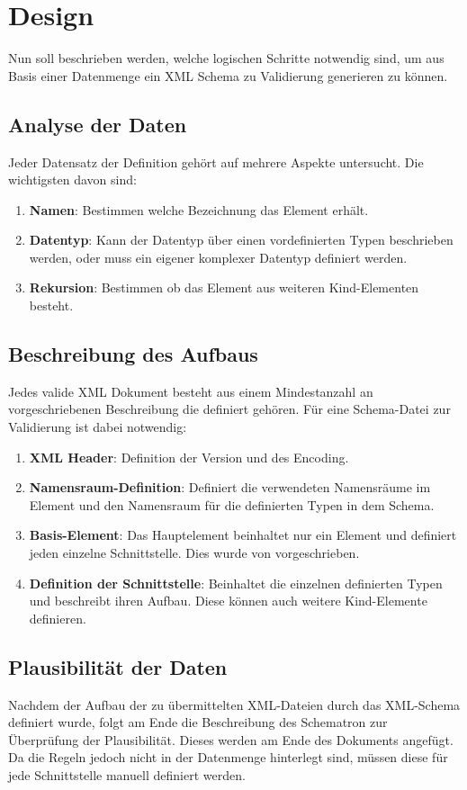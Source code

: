 \chapter{Design}
\label{cha:Design}
Nun soll beschrieben werden, welche logischen Schritte notwendig sind, um aus Basis einer Datenmenge ein XML Schema zu Validierung generieren zu können.

\section{Analyse der Daten}
Jeder Datensatz der Definition gehört auf mehrere Aspekte untersucht.
Die wichtigsten davon sind:

\begin{enumerate}
\item \textbf{Namen}: Bestimmen welche Bezeichnung das Element erhält.
\item \textbf{Datentyp}: Kann der Datentyp über einen vordefinierten Typen beschrieben werden, oder muss ein eigener komplexer Datentyp definiert werden. 
\item \textbf{Rekursion}: Bestimmen ob das Element aus weiteren Kind-Elementen besteht. 
\end{enumerate}

\section{Beschreibung des Aufbaus}
Jedes valide XML Dokument besteht aus einem Mindestanzahl an vorgeschriebenen Beschreibung die definiert gehören.
Für eine Schema-Datei zur Validierung ist dabei notwendig:

\begin{enumerate}
\item \textbf{XML Header}: Definition der Version und des Encoding.
\item \textbf{Namensraum-Definition}: Definiert die verwendeten Namensräume im Element und den Namensraum für die definierten Typen in dem Schema.
\item \textbf{Basis-Element}: Das Hauptelement beinhaltet nur ein Element und definiert jeden einzelne Schnittstelle. Dies wurde von \BMD vorgeschrieben.
\item \textbf{Definition der Schnittstelle}: Beinhaltet die einzelnen definierten Typen und beschreibt ihren Aufbau. Diese können auch weitere Kind-Elemente definieren.
\end{enumerate}

\section{Plausibilität der Daten}
Nachdem der Aufbau der zu übermittelten XML-Dateien durch das XML-Schema definiert wurde, folgt am Ende die Beschreibung des Schematron zur Überprüfung der Plausibilität.
Dieses werden am Ende des Dokuments angefügt. Da die Regeln jedoch nicht in der Datenmenge hinterlegt sind, müssen diese für jede Schnittstelle manuell definiert werden.
